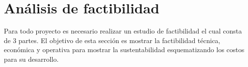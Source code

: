 \section{Análisis de factibilidad}

Para todo proyecto es necesario realizar un estudio de factibilidad el cual consta de 3 partes. El objetivo de esta sección es mostrar la factibilidad técnica, económica y operativa para mostrar la sustentabilidad esquematizando los costos para su desarrollo.
